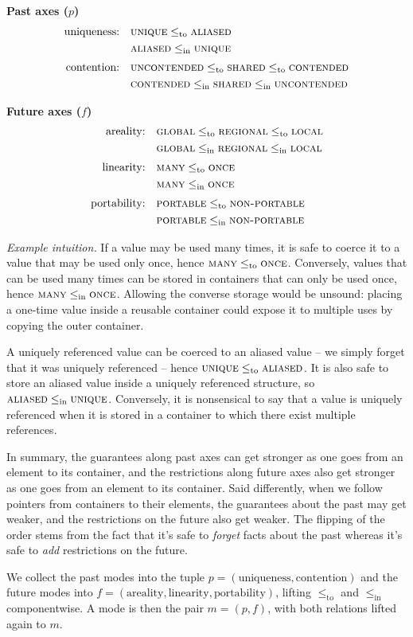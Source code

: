 \documentclass{article}
\newcommand{\leqto}{\mathrel{\leq_{\mathrm{to}}}}
\newcommand{\leqin}{\mathrel{\leq_{\mathrm{in}}}}
\newcommand{\mode}[1]{\textsc{#1}}
\begin{document}
\medskip
\noindent\textbf{Past axes ($p$)}
\[
\begin{alignedat}{2}
\text{uniqueness:}&\quad \mode{unique} \leqto \mode{aliased}\\
&\quad \mode{aliased} \leqin \mode{unique}\\[0.5ex]
\text{contention:}&\quad \mode{uncontended} \leqto \mode{shared} \leqto \mode{contended}\\
&\quad \mode{contended} \leqin \mode{shared} \leqin \mode{uncontended}
\end{alignedat}
\]

\medskip
\noindent\textbf{Future axes ($f$)}
\[
\begin{alignedat}{2}
\text{areality:}&\quad \mode{global} \leqto \mode{regional} \leqto \mode{local}\\
&\quad \mode{global} \leqin \mode{regional} \leqin \mode{local}\\[0.5ex]
\text{linearity:}&\quad \mode{many} \leqto \mode{once}\\
&\quad \mode{many} \leqin \mode{once}\\[0.5ex]
\text{portability:}&\quad \mode{portable} \leqto \mode{non-portable}\\
&\quad \mode{portable} \leqin \mode{non-portable}
\end{alignedat}
\]

\noindent\emph{Example intuition.}
If a value may be used many times, it is safe to coerce it to a value that may be used only once, hence $\mode{many} \leqto \mode{once}$.
Conversely, values that can be used many times can be stored in containers that can only be used once, hence $\mode{many} \leqin \mode{once}$.
Allowing the converse storage would be unsound: placing a one-time value inside a reusable container could expose it to multiple uses by copying the outer container.

A uniquely referenced value can be coerced to an aliased value -- we simply forget that it was uniquely referenced -- hence $\mode{unique} \leqto \mode{aliased}$. It is also safe to store an aliased value inside a uniquely referenced structure, so $\mode{aliased} \leqin \mode{unique}$. Conversely, it is nonsensical to say that a value is uniquely referenced when it is stored in a container to which there exist multiple references.

In summary, the guarantees along past axes can get stronger as one goes from an element to its container, and the restrictions along future axes also get stronger as one goes from an element to its container.
Said differently, when we follow pointers from containers to their elements, the guarantees about the past may get weaker, and the restrictions on the future also get weaker.
The flipping of the order stems from the fact that it's safe to \emph{forget} facts about the past whereas it's safe to \emph{add} restrictions on the future.

\medskip                               
We collect the past modes into the tuple $p = (\text{uniqueness}, \text{contention})$ and the future modes into $f = (\text{areality}, \text{linearity}, \text{portability})$, lifting $\leqto$ and $\leqin$ componentwise.
A mode is then the pair $m = (p, f)$, with both relations lifted again to $m$.
\end{document}
